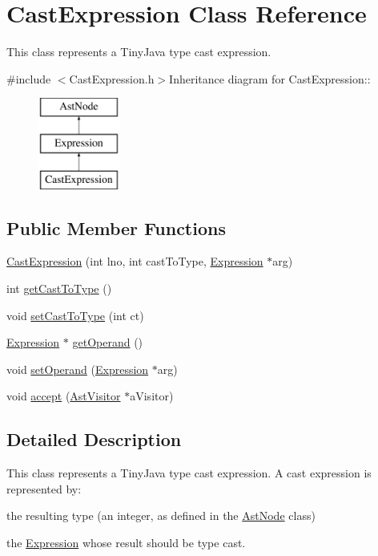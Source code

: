 \hypertarget{classCastExpression}{
\section{CastExpression Class Reference}
\label{classCastExpression}
}


This class represents a TinyJava type cast expression.  


{\ttfamily \#include $<$CastExpression.h$>$}Inheritance diagram for CastExpression::\begin{figure}[H]
\begin{center}
\leavevmode
\includegraphics[height=3cm]{classCastExpression}
\end{center}
\end{figure}
\subsection*{Public Member Functions}
\begin{DoxyCompactItemize}
\item 
\hyperlink{classCastExpression_a1c5bdbe92eabf17c09577c39937f4ff0}{CastExpression} (int lno, int castToType, \hyperlink{classExpression}{Expression} $\ast$arg)
\item 
int \hyperlink{classCastExpression_aa6ba133577fc9296450cb88410a24853}{getCastToType} ()
\item 
void \hyperlink{classCastExpression_ae0d08e3b57a33740d1d85f283ed755ab}{setCastToType} (int ct)
\item 
\hyperlink{classExpression}{Expression} $\ast$ \hyperlink{classCastExpression_ac35b327f25747795273b7bf991c77eef}{getOperand} ()
\item 
void \hyperlink{classCastExpression_ac24a64d42327406feeee20ef0b641c6b}{setOperand} (\hyperlink{classExpression}{Expression} $\ast$arg)
\item 
void \hyperlink{classCastExpression_af98e34f83dce5fec6d21f4baf4679dea}{accept} (\hyperlink{classAstVisitor}{AstVisitor} $\ast$aVisitor)
\end{DoxyCompactItemize}


\subsection{Detailed Description}
This class represents a TinyJava type cast expression. A cast expression is represented by:
\begin{DoxyItemize}
\item the resulting type (an integer, as defined in the \hyperlink{classAstNode}{AstNode} class)
\item the \hyperlink{classExpression}{Expression} whose result should be type cast. 
\end{DoxyItemize}

